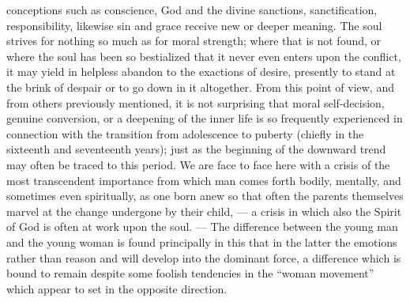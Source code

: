 conceptions such as conscience, God and the divine sanctions, sanctification, responsibility, likewise sin and grace receive new or deeper meaning. The soul strives for nothing so much as for moral strength; where that is not found, or where the soul has been so bestialized that it never even enters upon the conflict, it may yield in helpless abandon to the exactions of desire, presently to stand at the brink of despair or to go down in it altogether. From this point of view, and from others previously mentioned, it is not surprising that moral self-decision, genuine conversion, or a deepening of the inner life is so frequently experienced in connection with the transition from adolescence to puberty (chiefly in the sixteenth and seventeenth years); just as the beginning of the downward trend may often be traced to this period. We are face to face here with a crisis of the most transcendent importance from which man comes forth bodily, mentally, and sometimes even spiritually, as one born anew so that often the parents themselves marvel at the change undergone by their child, — a crisis in which also the Spirit of God is often at work upon the soul. — The difference between the young man and the young woman is found principally in this that in the latter the emotions rather than reason and will develop into the dominant force, a difference which is bound to remain despite some foolish tendencies in the “woman movement” which appear to set in the opposite direction.


